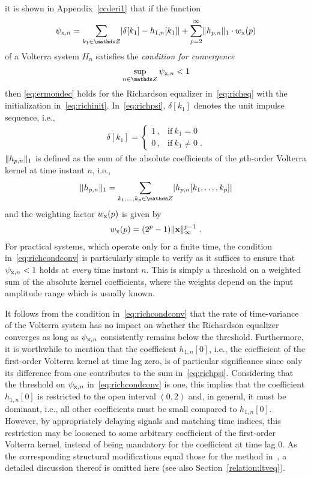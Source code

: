 \documentclass[10pt,twocolumn,twoside]{IEEEtran}
\begin{document}
it is shown in Appendix~\ref{ccderi1} that if the function
\begin{align}
	\spsi{x}{n} = \sum_{k_1\in\Z} \abs{\delta[k_1]-h_{1,n}[k_1]}
		+ \sum_{p=2}^\infty \normone{h_{p,n}}\cdot \sw{x}(p)
	\label{eq:richpsi}
\end{align}
of a Volterra system $H_n$ satisfies the \emph{condition for convergence}
\begin{align}
	\sup_{n\in\Z} \spsi{x}{n} < 1
	\label{eq:richcondconv}
\end{align}
then \eqref{eq:ermondec} holds for the Richardson equalizer in~\eqref{eq:richeq}
with the initialization in~\eqref{eq:richinit}.
In~\eqref{eq:richpsi}, $\delta[k_1]$ denotes the unit impulse sequence, i.e.,
\begin{align}
	\delta[k_1] =
		\left\{
			\begin{array}{ll}
				1\,, & \text{if}\ k_1 = 0\\
				0\,, & \text{if}\ k_1 \neq 0\;.
			\end{array}
		\right.
	\label{eq:deltadef}
\end{align}
$\lVert h_{p,n}\rVert_1$ is defined as the sum of the absolute coefficients of the
$p$th-order Volterra kernel at time instant $n$, i.e.,
\begin{align}
	\normone{h_{p,n}} = \sum_{k_1,\ldots,k_p\in\Z} \abs{h_{p,n}[k_1,\ldots,k_p]}
	\label{eq:hpnnorm}
\end{align}
and the weighting factor $w_{\mathrm{x}}(p)$ is given by
\begin{align}
	w_{\mathrm{x}}(p) = (2^p-1) \lVert\bm{\mathrm{x}}\rVert_\infty^{p-1}\;.
	\label{eq:wdef}
\end{align}
For practical systems, which operate only for a finite time,
the condition in~\eqref{eq:richcondconv} is particularly
simple to verify as it suffices to ensure that $\psi_{\mathrm{x},n}<1$
holds at \emph{every} time instant $n$. This is simply a threshold on a weighted
sum of the absolute kernel coefficients, where the weights
depend on the input amplitude range which is usually known.

It follows from the condition in~\eqref{eq:richcondconv}
that the rate of time-variance of the Volterra system
has no impact on whether the Richardson equalizer converges as long as
$\psi_{\mathrm{x},n}$ consistently remains below the threshold. Furthermore, it is worthwhile to mention that the coefficient $h_{1,n}[0]$,
i.e., the coefficient of the first-order Volterra kernel
at time lag zero, is of particular significance since only its
difference from one contributes to the sum in~\eqref{eq:richpsi}.
Considering that the threshold on $\psi_{\mathrm{x},n}$ in~\eqref{eq:richcondconv} is one,
this implies that the coefficient $h_{1,n}[0]$ is restricted to the open
interval $(0,2)$ and, in general, it must be dominant, i.e.,
all other coefficients must be small compared to
$h_{1,n}[0]$. However, by appropriately delaying signals and
matching time indices, this restriction may be loosened
to some arbitrary coefficient of the first-order
Volterra kernel, instead of being mandatory for the coefficient at time lag $0$.
As the corresponding structural modifications equal those for the method
in~\cite{soudan2012}, a detailed discussion thereof is omitted here
(see also Section~\ref{relation:ltveq}).
\end{document}
